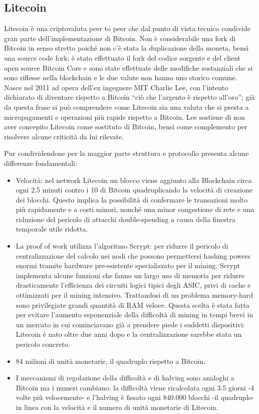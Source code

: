 \subsection{Litecoin}
Litecoin è una criptovaluta peer to peer che dal punto di vista tecnico condivide gran parte dell’implementazione di Bitcoin. Non è considerabile una fork di Bitcoin in senso stretto poiché non c’è stata la duplicazione della moneta, bensì una source code fork: è stato effettuato il fork del codice sorgente e del client open source Bitcoin Core e sono state effettuate delle modifiche sostanziali che si sono riflesse nella blockchain e le due valute non hanno uno storico comune. 
Nasce nel 2011 ad opera dell’ex ingegnere MIT Charlie Lee, con l’intento dichiarato di diventare rispetto a Bitcoin “ciò che l’argento è rispetto all’oro”\cite{mediumltcsilver}; già da questa frase si può comprendere come Litecoin sia una valuta che si presta a micropagamenti e operazioni più rapide rispetto a Bitcoin. Lee sostiene di non aver concepito Litecoin come sostituto di Bitcoin, bensì come complemento per risolvere alcune criticità da lui rilevate.

Pur condividendone per la maggior parte struttura e protocollo presenta alcune differenze fondamentali:
\begin{itemize}
\item Velocità: nel network Litecoin un blocco viene aggiunto alla Blockchain circa ogni 2.5 minuti contro i 10 di Bitcoin quadruplicando la velocità di creazione dei blocchi. Questo implica la possibilità di confermare le transazioni molto più rapidamente e a costi minori, nonché una minor congestione di rete e una riduzione del pericolo di attacchi double-spending a causa della finestra temporale utile ridotta.
\item La proof of work utilizza l’algoritmo Scrypt: per ridurre il pericolo di centralizzazione del calcolo nei nodi che possono permettersi hashing powers enormi tramite hardware pre-esistente specializzato per il mining.
Scrypt implementa alcune funzioni che fanno un largo uso di memoria per ridurre drasticamente l’efficienza dei circuiti logici tipici degli ASIC, privi di cache e ottimizzati per il mining intensivo. Trattandosi di un problema memory-hard sono privilegiate grandi quantità di RAM veloce. 
Questa scelta è stata fatta per evitare l’aumento esponenziale della difficoltà di mining in tempi brevi in un mercato in cui cominciavano già a prendere piede i suddetti dispositivi: Litecoin è nato oltre due anni dopo e la centralizzazione sarebbe stata un pericolo concreto.
\item 84 milioni di unità monetarie, il quadruplo rispetto a Bitcoin.
\item I meccanismi di regolazione della difficoltà e di halving sono analoghi a Bitcoin ma i numeri cambiano: la difficoltà viene ricalcolata ogni 3.5 giorni -4 volte più velocemente- e l’halving è fissato ogni 840.000 blocchi -il quadruplo- in linea con la velocità e il numero di unità monetarie di Litecoin.
\end{itemize}

